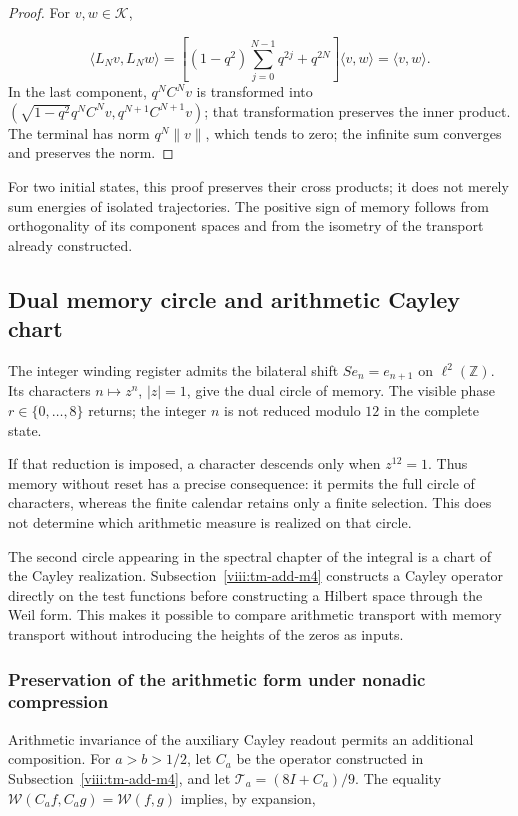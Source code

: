 \begin{proof}
For \(v,w\in\mathcal K\),

\[
\langle L_Nv,L_Nw\rangle
=\left[(1-q^2)\sum_{j=0}^{N-1}q^{2j}+q^{2N}\right]
\langle v,w\rangle=\langle v,w\rangle.
\]
In the last component, \(q^NC^Nv\) is transformed into \((\sqrt{1-q^2}q^NC^Nv,q^{N+1}C^{N+1}v)\); that transformation preserves the inner product. The terminal has norm \(q^N\|v\|\), which tends to zero; the infinite sum converges and preserves the norm.
\end{proof}

For two initial states, this proof preserves their cross products; it does not merely sum energies of isolated trajectories. The positive sign of memory follows from orthogonality of its component spaces and from the isometry of the transport already constructed.


\subsection{Dual memory circle and arithmetic Cayley chart}
\label{viii:tm-add-c4}
The integer winding register admits the bilateral shift \(Se_n=e_{n+1}\) on \(\ell^2(\mathbb Z)\). Its characters \(n\mapsto z^n\), \(|z|=1\), give the dual circle of memory. The visible phase \(r\in\{0,\ldots,8\}\) returns; the integer \(n\) is not reduced modulo \(12\) in the complete state.

If that reduction is imposed, a character descends only when \(z^{12}=1\). Thus memory without reset has a precise consequence: it permits the full circle of characters, whereas the finite calendar retains only a finite selection. This does not determine which arithmetic measure is realized on that circle.

The second circle appearing in the spectral chapter of the integral is a chart of the Cayley realization. Subsection~\ref{viii:tm-add-m4} constructs a Cayley operator directly on the test functions before constructing a Hilbert space through the Weil form. This makes it possible to compare arithmetic transport with memory transport without introducing the heights of the zeros as inputs.


\subsubsection{Preservation of the arithmetic form under nonadic compression}
\label{viii:tm-add-c4-1}
Arithmetic invariance of the auxiliary Cayley readout permits an additional composition. For \(a>b>1/2\), let \(C_a\) be the operator constructed in Subsection~\ref{viii:tm-add-m4}, and let \(\mathcal T_a=(8I+C_a)/9\). The equality \(\mathscr W(C_af,C_ag)=\mathscr W(f,g)\) implies, by expansion,

